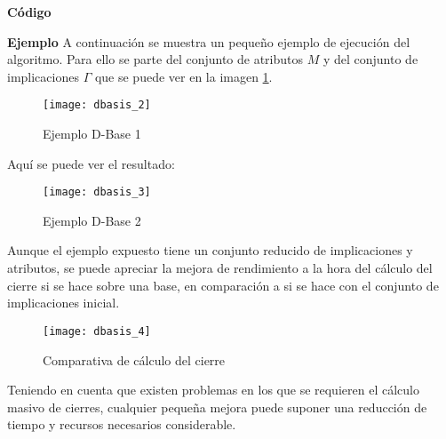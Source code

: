 \newpage 
\textbf{C\'odigo} 

\newpage
\textbf{Ejemplo}
A continuaci\'on se muestra un peque\~no ejemplo de ejecuci\'on del algoritmo. Para ello se parte del conjunto de atributos \(M\) y del conjunto de implicaciones \(\Gamma\) que se puede ver en la imagen \ref{fig:dbasis_2}.
\begin{figure}[H]
    \centering
    \texttt{[image: dbasis\_2]}
    \caption{Ejemplo D-Base 1}
    \label{fig:dbasis_2}
\end{figure} 
Aqu\'i se puede ver el resultado:
\begin{figure}[H]
    \centering
    \texttt{[image: dbasis\_3]}
    \caption{Ejemplo D-Base 2}
    \label{fig:dbasis_3}
\end{figure} 
Aunque el ejemplo expuesto tiene un conjunto reducido de implicaciones y atributos, se puede apreciar la mejora de rendimiento a la hora del c\'alculo del cierre si se hace sobre una base, en comparaci\'on a si se hace con el conjunto de implicaciones inicial.
\begin{figure}[H]
    \centering
    \texttt{[image: dbasis\_4]}
    \caption{Comparativa de c\'alculo del cierre}
    \label{fig:dbasis_4}
\end{figure} 

Teniendo en cuenta que existen problemas en los que se requieren el c\'alculo masivo de cierres, cualquier peque\~na mejora puede suponer una reducci\'on de tiempo y recursos necesarios considerable.